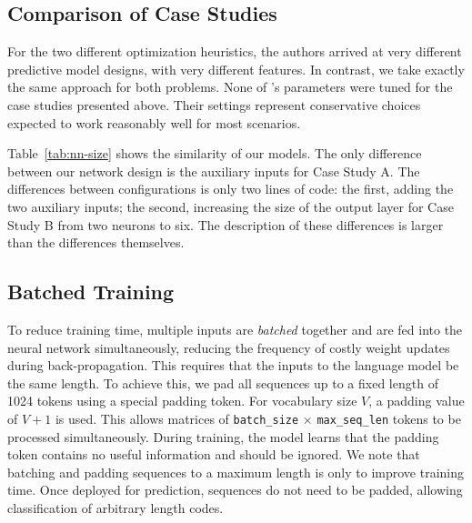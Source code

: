 \subsection{Comparison of Case Studies}



For the two different optimization heuristics, the authors arrived at very different predictive model designs, with very different features. In contrast, we take exactly the same approach for both problems. None of \DeepTune's parameters were tuned for the case studies presented above. Their settings represent conservative choices expected to work reasonably well for most scenarios.

Table~\ref{tab:nn-size} shows the similarity of our models. The only difference between our network design is the auxiliary inputs for Case Study A. The differences between \DeepTune configurations is only two lines of code: the first, adding the two auxiliary inputs; the second, increasing the size of the output layer for Case Study B from two neurons to six. The description of these differences is larger than the differences themselves.


\subsection{Batched Training}

To reduce training time, multiple inputs are \emph{batched} together and are fed into the neural network simultaneously, reducing the frequency of costly weight updates during back-propagation. This requires that the inputs to the language model be the same length. To achieve this, we pad all sequences up to a fixed length of 1024 tokens using a special padding token. For vocabulary size $V$, a padding value of $V+1$ is used. This allows matrices of \texttt{batch\_size} $\times$ \texttt{max\_seq\_len} tokens to be processed simultaneously. During training, the model learns that the padding token contains no useful information and should be ignored. We note that batching and padding sequences to a maximum length is only to improve training time. Once deployed for prediction, sequences do not need to be padded, allowing classification of arbitrary length codes. 
